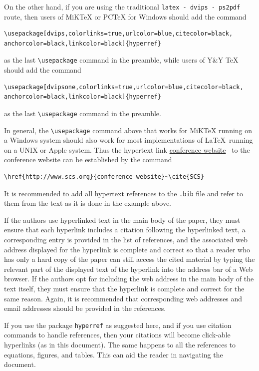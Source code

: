 \documentclass{scspaperproc}
\theoremstyle{scsthe}
\begin{document}
On the other hand, if you are using the traditional \texttt{latex - dvips - ps2pdf} route, then users of MiKTeX or PCTeX for Windows should add the command

\begin{verbatim}
\usepackage[dvips,colorlinks=true,urlcolor=blue,citecolor=black,
anchorcolor=black,linkcolor=black]{hyperref}
\end{verbatim}

as the last \verb+\usepackage+ command in the preamble, while users of Y\&Y TeX should add the command

\begin{verbatim}
\usepackage[dvipsone,colorlinks=true,urlcolor=blue,citecolor=black,
anchorcolor=black,linkcolor=black]{hyperref}
\end{verbatim}

as the last \verb+\usepackage+ command in the preamble.

In general, the \verb+\usepackage+ command above that works for MiKTeX running on a Windows system should also work for most implementations of \LaTeX\ running on a UNIX or Apple system.
Thus the hypertext link \href{http://www.scs.org}{conference website}~\cite{SCS} to the conference website can be established by the command

\begin{verbatim}
\href{http://www.scs.org}{conference website}~\cite{SCS}
\end{verbatim}

It is recommended to add all hypertext references to the \texttt{.bib} file and refer to them from the text as it is done in the example above.

If the authors use hyperlinked text in the main body of the paper, they must ensure that each hyperlink includes a citation following the hyperlinked text, a corresponding entry is provided in the list of references, and the associated web address displayed for the hyperlink is complete and correct so that a reader who has only a hard copy of the paper can still access the cited material by typing the relevant part of the displayed text of the hyperlink into the address bar of a Web browser. If the authors opt for including the web address in the main body of the text itself, they must ensure that the hyperlink is complete and correct for the same reason. Again, it is recommended that corresponding web addresses and email addresses should be provided in the references.

If you use the package \texttt{hyperref} as suggested here, and if you use citation commands to handle references, then your citations will
become click-able hyperlinks (as in this document). The same happens to all the references to equations, figures, and tables. This can aid the reader in navigating the document.
\end{document}
